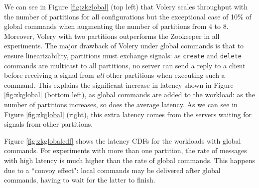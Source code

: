 We can see in Figure \ref{fig:zkglobal} (top left) that Volery scales throughput with the number of partitions for all configurations but the exceptional case of 10\% of global commands when augmenting the number of partitions from 4 to 8.
Moreover, Volery with two partitions outperforms the Zookeeper in all experiments.
The major drawback of Volery under global commands is that to ensure linearizability, partitions must exchange signals: as \verb#create# and \verb#delete# commands are multicast to all partitions, no server can send a reply to a client before receiving a signal from \emph{all} other partitions when executing such a command. 
This explains the significant increase in latency shown in Figure \ref{fig:zkglobal} (bottom left), as global commands are added to the workload: as the number of partitions increases, so does the average latency. 
As we can see in Figure \ref{fig:zkglobal} (right), this extra latency comes from the servers waiting for signals from other partitions.

Figure \ref{fig:zkglobalcdf} shows the latency CDFs for the workloads with global commands. 
For experiments with more than one partition, the rate of messages with high latency is much higher than the rate of global commands. 
This happens due to a ``convoy effect": local commands may be delivered after global commands, having to wait for the latter to finish.

%
%
